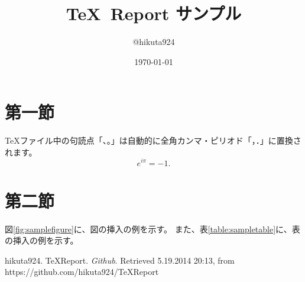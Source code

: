 
\title{\TeX\ Report サンプル}
\author{@hikuta924}
\date{\today}

\maketitle

\section{第一節}
TeXファイル中の句読点「、。」は自動的に全角カンマ・ピリオド「，．」に置換されます。
\begin{equation}
	e^{i \pi} = -1.
\end{equation}

\section{第二節}
図\ref{fig:samplefigure}に、図の挿入の例を示す。
また、表\ref{table:sampletable}に、表の挿入の例を示す。


\begin{thebibliography}{A99}
     hikuta924. TeXReport. {\em Github}. Retrieved 5.19.2014 20:13, from https://github.com/hikuta924/TeXReport
\end{thebibliography}


